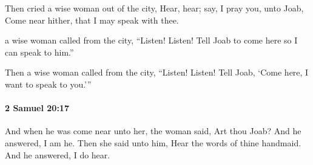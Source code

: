 			\begin{versebox}
					\item[BHS] 
					\item[ASV] Then cried a wise woman out of the city, Hear, hear; say, I pray you, unto Joab, Come near hither, that I may speak with thee.
					\item[NIV] a wise woman called from the city, “Listen! Listen! Tell Joab to come here so I can speak to him.”
					\item[NRSV] Then a wise woman called from the city, “Listen! Listen! Tell Joab, ‘Come here, I want to speak to you.’”
			\end{versebox}

		\paragraph{2 Samuel 20:17} %
			\label{2SAMUEL-20-17}

			And when he was come near unto her, the woman said, Art thou Joab? And he answered, I am he. Then she said unto him, Hear the words of thine handmaid. And he answered, I do hear.

